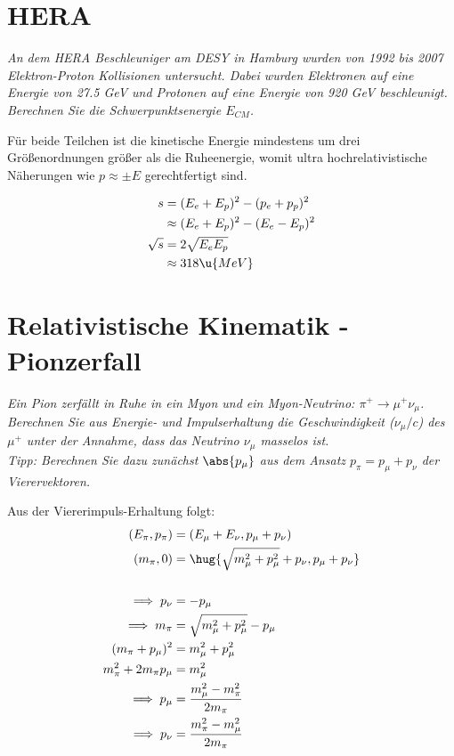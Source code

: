 \documentclass[exb]{exercise_5.0}
\begin{document}
\section{HERA}
{\it An dem HERA Beschleuniger am DESY in Hamburg wurden von 1992 bis 2007 Elektron-Proton Kollisionen untersucht. Dabei wurden Elektronen auf eine Energie von 27.5 GeV und Protonen auf eine Energie von 920 GeV beschleunigt. Berechnen Sie die Schwerpunktsenergie $E_{CM}$.}

\dottedlinett

Für beide Teilchen ist die kinetische Energie mindestens um drei Größenordnungen größer als die Ruheenergie, womit ultra hochrelativistische Näherungen wie $p\approx \pm E$ gerechtfertigt sind.

\begin{align*}
    s &= (E_e + E_p)^2 - (p_e + p_p)^2\\
    &\approx (E_e + E_p)^2 - (E_e - E_p)^2\\
    \sqrt s&= 2 \sqrt{E_e E_p} \\
    &\approx 318 \u{MeV}
\end{align*}

\section{Relativistische Kinematik - Pionzerfall}
{\it Ein Pion zerfällt in Ruhe in ein Myon und ein Myon-Neutrino: $\pi^+ \to \mu^+\nu_\mu$. Berechnen Sie aus Energie- und Impulserhaltung die Geschwindigkeit ($\nu_\mu/c$) des $\mu^+$
unter der Annahme, dass das Neutrino $\nu_\mu$ masselos ist.\\[1ex]
Tipp: Berechnen Sie dazu zunächst $\abs{p_\mu}$ aus dem Ansatz $p_\pi=p_\mu + p_\nu$ der Vierervektoren.}

\dottedlinett

Aus der Viererimpuls-Erhaltung folgt:
\begin{align*}
    (E_\pi,  p_\pi) &= (E_\mu + E_\nu, p_\mu + p_\nu)\\
    (m_\pi,0) &= \hug{\sqrt{m_\mu^2 + p_\mu^2} + p_\nu, p_\mu + p_\nu}\\
    \\
    \implies p_\nu &= - p_\mu\\
    \implies m_\pi &= \sqrt{m_\mu^2 + p_\mu^2} - p_\mu\\
    (m_\pi + p_\mu)^2 &= m_\mu^2 + p_\mu^2\\
    m_\pi^2 + 2m_\pi p_\mu &= m_\mu^2 \\
    \implies p_\mu &= \frac{m_\mu^2 - m_\pi^2}{2m_\pi } \\
    \implies p_\nu &= \frac{m_\pi^2 - m_\mu^2}{2m_\pi }
\end{align*}
\end{document}
